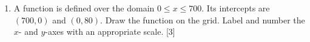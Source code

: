 \documentclass[12pt, twoside]{article}
\begin{document}
\begin{enumerate}
\newpage
\item A function is defined over the domain $0 \leq x \leq 700$. Its intercepts are $(700,0)$ and $(0, 80)$. Draw the function on the grid. Label and number the $x$- and $y$-axes with an appropriate scale. \hfill [3]
  \begin{center}
  \end{center}
  
\end{enumerate}
\end{document}
